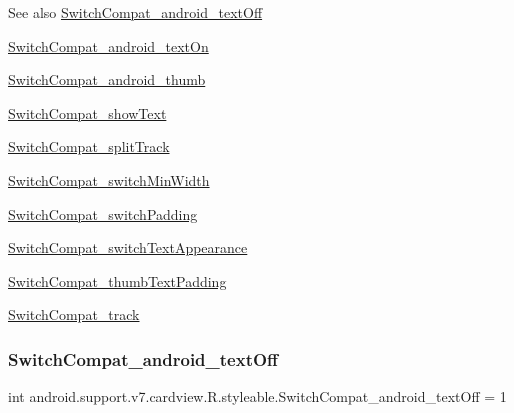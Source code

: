 \begin{DoxySeeAlso}{See also}
\hyperlink{classandroid_1_1support_1_1v7_1_1cardview_1_1R_1_1styleable_a1bc9b7fb068e2c5acdee2d1f23283c6e}{Switch\+Compat\+\_\+android\+\_\+text\+Off} 

\hyperlink{classandroid_1_1support_1_1v7_1_1cardview_1_1R_1_1styleable_a0aca0706e8d4b21ec30c7df58ce31033}{Switch\+Compat\+\_\+android\+\_\+text\+On} 

\hyperlink{classandroid_1_1support_1_1v7_1_1cardview_1_1R_1_1styleable_a3a27aac17c76def284b1d0b7610ccc61}{Switch\+Compat\+\_\+android\+\_\+thumb} 

\hyperlink{classandroid_1_1support_1_1v7_1_1cardview_1_1R_1_1styleable_ad2a7ec0499f9c6b3a7bfda457a82be97}{Switch\+Compat\+\_\+show\+Text} 

\hyperlink{classandroid_1_1support_1_1v7_1_1cardview_1_1R_1_1styleable_adb2fe94b52e4196f86533c6c9620503e}{Switch\+Compat\+\_\+split\+Track} 

\hyperlink{classandroid_1_1support_1_1v7_1_1cardview_1_1R_1_1styleable_ae69add4745baa57c245f73ea9040dcec}{Switch\+Compat\+\_\+switch\+Min\+Width} 

\hyperlink{classandroid_1_1support_1_1v7_1_1cardview_1_1R_1_1styleable_a282efd9317f1b44049acf1c53d892763}{Switch\+Compat\+\_\+switch\+Padding} 

\hyperlink{classandroid_1_1support_1_1v7_1_1cardview_1_1R_1_1styleable_aee6b23536fd36623a9dd00ddd13596e8}{Switch\+Compat\+\_\+switch\+Text\+Appearance} 

\hyperlink{classandroid_1_1support_1_1v7_1_1cardview_1_1R_1_1styleable_ab38025adbf83386aabd5df58f36bd8cb}{Switch\+Compat\+\_\+thumb\+Text\+Padding} 

\hyperlink{classandroid_1_1support_1_1v7_1_1cardview_1_1R_1_1styleable_a0694f9f648cee027249017c5733efdb5}{Switch\+Compat\+\_\+track} 
\end{DoxySeeAlso}
\mbox{\label{classandroid_1_1support_1_1v7_1_1cardview_1_1R_1_1styleable_a1bc9b7fb068e2c5acdee2d1f23283c6e}} 
\subsubsection{\texorpdfstring{Switch\+Compat\+\_\+android\+\_\+text\+Off}{SwitchCompat\_android\_textOff}}
{\footnotesize\ttfamily int android.\+support.\+v7.\+cardview.\+R.\+styleable.\+Switch\+Compat\+\_\+android\+\_\+text\+Off = 1\hspace{0.3cm}{\ttfamily [static]}}

